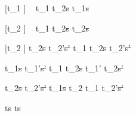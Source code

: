 




[t_1 \neq \Fail]
  {\ }
  {t_1 \Xor t_2\st{s} \handle{\Pick \First} t_1\st{s}}

[t_2 \neq \Fail]
  {\ }
  {t_1 \Xor t_2\st{s} \handle{\Pick \Second} t_2\st{s}}

[t_2 \neq \Fail]
  {t_2\st{s} \handle{\Pick \pi} t_2'\st{s'}}
  {t_1 \Xor t_2\st{s} \handle{\Pick \Other \pi} t_2'\st{s'}}

  {t_1\st{s}  t_1'\st{s'} }
  {t_1 \AndOr t_2\st{s}  t_1' \AndOr t_2\st{s'}}

  {t_2\st{s}  t_2'\st{s'} }
  {t_1\st{s} \AndOr t_2  t_1 \AndOr t_2'\st{s'}}

  { }
  {t\st{s}  t\st{s}}

